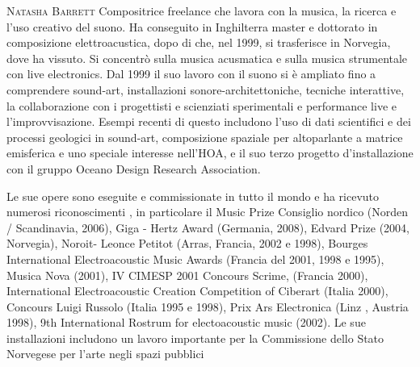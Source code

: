 \documentclass[8pt, twoside, a5paper]{extreport}
\newcommand{\biografia}[2]{%
\noindent \textsc{#1} %
#2 %
\medskip
}%
\begin{document}
\begin{multicols}{2}

\biografia{Natasha Barrett}{Compositrice freelance che lavora con la musica, la ricerca e l'uso creativo del suono. Ha conseguito in Inghilterra master e dottorato in composizione elettroacustica, dopo di che, nel 1999, si trasferisce in Norvegia, dove ha vissuto. Si concentrò sulla musica acusmatica e sulla musica strumentale con live electronics. Dal 1999 il suo lavoro con il suono si è ampliato fino a comprendere sound-art, installazioni sonore-architettoniche, tecniche interattive, la collaborazione con i progettisti e scienziati sperimentali e performance live e l'improvvisazione. Esempi recenti di questo includono l'uso di dati scientifici e dei processi geologici in sound-art, composizione spaziale per altoparlante a matrice emisferica e uno speciale interesse nell’HOA, e il suo terzo progetto d’installazione con il gruppo Oceano Design Research Association.

Le sue opere sono eseguite e commissionate in tutto il mondo e ha ricevuto numerosi riconoscimenti , in particolare il Music Prize Consiglio nordico (Norden / Scandinavia, 2006), Giga - Hertz Award (Germania, 2008), Edvard Prize (2004, Norvegia), Noroit- Leonce Petitot (Arras, Francia, 2002 e 1998), Bourges International Electroacoustic Music Awards (Francia del 2001, 1998 e 1995), Musica Nova (2001), IV CIMESP 2001 Concours Scrime, (Francia 2000), International Electroacoustic Creation Competition of Ciberart (Italia 2000), Concours Luigi Russolo (Italia 1995 e 1998), Prix Ars Electronica (Linz , Austria 1998), 9th International Rostrum for electoacoustic music (2002). Le sue installazioni includono un lavoro importante per la Commissione dello Stato Norvegese per l'arte negli spazi pubblici}


\end{multicols}

\clearpage

\section*{ }


\end{document}
